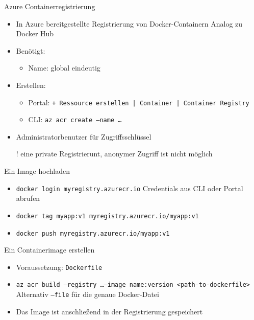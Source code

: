 \begin{flashcard}[Definition]{Azure Containerregistrierung}
    \begin{itemize}
        \item In Azure bereitgestellte Registrierung von Docker-Containern\newline
            Analog zu Docker Hub
        \item Benötigt:
            \begin{itemize}
                \item Name: global eindeutig
            \end{itemize}
        \item Erstellen:
            \begin{itemize}
                \item Portal: \texttt{+ Ressource erstellen | Container | Container Registry}
                \item CLI: \texttt{az acr create --name \ldots}
            \end{itemize}
        \item Administratorbenutzer für Zugriffsschlüssel
        \item[!] eine private Registrierunt, anonymer Zugriff ist nicht möglich
    \end{itemize}
\end{flashcard}

\begin{flashcard}[Definition]{Ein Image hochladen}
    \begin{itemize}
        \item \texttt{docker login myregistry.azurecr.io}\newline
            Credentials aus CLI oder Portal abrufen
        \item \texttt{docker tag myapp:v1 myregistry.azurecr.io/myapp:v1}
        \item \texttt{docker push myregistry.azurecr.io/myapp:v1}
    \end{itemize}
\end{flashcard}

\begin{flashcard}[Definition]{Ein Containerimage erstellen}
    \begin{itemize}
        \item Voraussetzung: \texttt{Dockerfile}
        \item \texttt{az acr build --registry \ldots --image name:version <path-to-dockerfile>}\newline
            Alternativ \texttt{--file} für die genaue Docker-Datei
        \item Das Image ist anschließend in der Registrierung gespeichert
    \end{itemize}
\end{flashcard}


